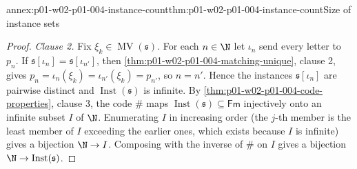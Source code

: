 \begin{annexitem}{annex:p01-w02-p01-004-instance-count}{thm:p01-w02-p01-004-instance-count}{Size of instance sets}
\begin{proof}
\emph{Clause 2.} Fix \(\xi_k\in\operatorname{MV}(\mathfrak s)\). For each
\(n\in\N\) let \(\iota_n\) send every letter to \(p_n\). If
\(\mathfrak s[\iota_n]=\mathfrak s[\iota_{n'}]\), then
\cref{thm:p01-w02-p01-004-matching-unique}, clause 2, gives
\(p_n=\iota_n(\xi_k)=\iota_{n'}(\xi_k)=p_{n'}\), so \(n=n'\). Hence the
instances \(\mathfrak s[\iota_n]\) are pairwise distinct and
\(\operatorname{Inst}(\mathfrak s)\) is infinite. By
\cref{thm:p01-w02-p01-004-code-properties}, clause 3, the code \(\#\) maps
\(\operatorname{Inst}(\mathfrak s)\subseteq\mathsf{Fm}\) injectively onto an
infinite subset \(I\) of \(\N\). Enumerating \(I\) in increasing order (the
\(j\)-th member is the least member of \(I\) exceeding the earlier ones, which
exists because \(I\) is infinite) gives a bijection \(\N\to I\). Composing with
the inverse of \(\#\) on \(I\) gives a bijection
\(\N\to\operatorname{Inst}(\mathfrak s)\).
\end{proof}
\end{annexitem}

